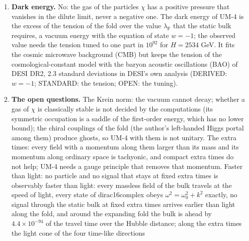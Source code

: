 \documentclass[
  10pt,
]{article}
\begin{document}
\begin{enumerate}
  the Higgs portal they would have to be bound so weakly (direct
  detection) that they would live long enough only for \(H < 2.5\) GeV,
  and bound by the gluon condensate they would scatter on nucleons far
  above the limits; nor can the current portals, which annihilate them
  only with the fourth power of the velocity, set the relic density of a
  perturbatively coupled \(\chi\). dirac16complex can be the dark matter
  of UM-4 only with a binding to the fold that does not couple \(\chi\)
  to nucleons, and, unless that binding is strong, with a non-thermal
  origin of its abundance; the action of UM-4 contains neither (DERIVED,
  ESTIMATE, OPEN).
\item
  \textbf{Dark energy.} No: the gas of the particles \(\chi\) has a
  positive pressure that vanishes in the dilute limit, never a negative
  one. The dark energy of UM-4 is the excess of the tension of the fold
  over the value \(\lambda_{\mathrm{F}}\) that the static bulk requires,
  a vacuum energy with the equation of state \(w = -1\); the observed
  value needs the tension tuned to one part in \(10^{92}\) for
  \(H = 2534\) GeV. It fits the cosmic microwave background (CMB) but
  keeps the tension of the cosmological-constant model with the baryon
  acoustic oscillations (BAO) of DESI DR2, 2.3 standard deviations in
  DESI's own analysis (DERIVED: \(w = -1\); STANDARD: the tension; OPEN:
  the tuning).
\item
  \textbf{The open questions.} The Krein norm: the vacuum cannot decay;
  whether a gas of \(\chi\) is classically stable is not decided by the
  computations (its symmetric occupation is a saddle of the first-order
  energy, which has no lower bound); the chiral couplings of the fold
  (the author's left-handed Higgs portal among them) produce ghosts, so
  UM-4 with them is not unitary. The extra times: every field with a
  momentum along them larger than its mass and its momentum along
  ordinary space is tachyonic, and compact extra times do not help; UM-4
  needs a gauge principle that removes that momentum. Faster than light:
  no particle and no signal that stays at fixed extra times is
  observably faster than light: every massless field of the bulk travels
  at the speed of light, every state of dirac16complex obeys
  \(\omega^2 = \omega_0^2 + k^2\) exactly, no signal through the static
  bulk at fixed extra times arrives earlier than light along the fold,
  and around the expanding fold the bulk is ahead by
  \(4.4\times10^{-94}\) of the travel time over the Hubble distance;
  along the extra times the light cone of the four time-like directions

\end{enumerate}
\end{document}
